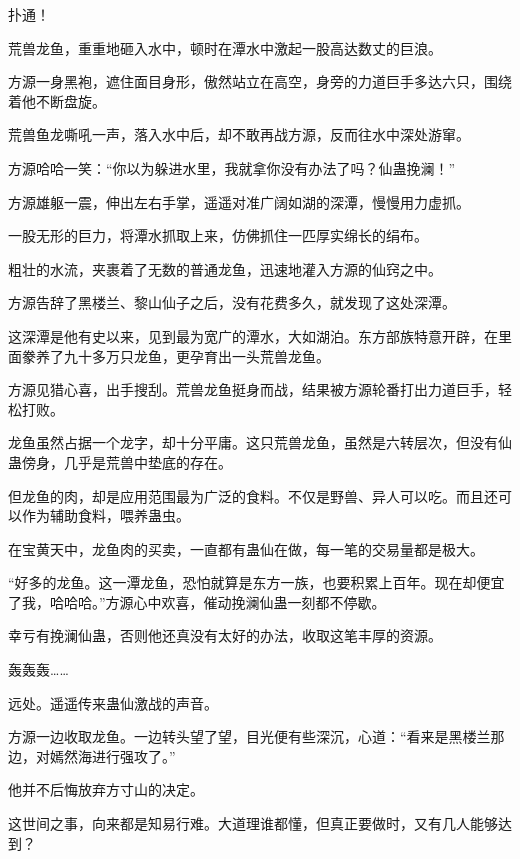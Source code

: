 
\begin{this_body}



扑通！

荒兽龙鱼，重重地砸入水中，顿时在潭水中激起一股高达数丈的巨浪。

方源一身黑袍，遮住面目身形，傲然站立在高空，身旁的力道巨手多达六只，围绕着他不断盘旋。

荒兽鱼龙嘶吼一声，落入水中后，却不敢再战方源，反而往水中深处游窜。

方源哈哈一笑：“你以为躲进水里，我就拿你没有办法了吗？仙蛊挽澜！”

方源雄躯一震，伸出左右手掌，遥遥对准广阔如湖的深潭，慢慢用力虚抓。

一股无形的巨力，将潭水抓取上来，仿佛抓住一匹厚实绵长的绢布。

粗壮的水流，夹裹着了无数的普通龙鱼，迅速地灌入方源的仙窍之中。

方源告辞了黑楼兰、黎山仙子之后，没有花费多久，就发现了这处深潭。

这深潭是他有史以来，见到最为宽广的潭水，大如湖泊。东方部族特意开辟，在里面豢养了九十多万只龙鱼，更孕育出一头荒兽龙鱼。

方源见猎心喜，出手搜刮。荒兽龙鱼挺身而战，结果被方源轮番打出力道巨手，轻松打败。

龙鱼虽然占据一个龙字，却十分平庸。这只荒兽龙鱼，虽然是六转层次，但没有仙蛊傍身，几乎是荒兽中垫底的存在。

但龙鱼的肉，却是应用范围最为广泛的食料。不仅是野兽、异人可以吃。而且还可以作为辅助食料，喂养蛊虫。

在宝黄天中，龙鱼肉的买卖，一直都有蛊仙在做，每一笔的交易量都是极大。

“好多的龙鱼。这一潭龙鱼，恐怕就算是东方一族，也要积累上百年。现在却便宜了我，哈哈哈。”方源心中欢喜，催动挽澜仙蛊一刻都不停歇。

幸亏有挽澜仙蛊，否则他还真没有太好的办法，收取这笔丰厚的资源。

轰轰轰……

远处。遥遥传来蛊仙激战的声音。

方源一边收取龙鱼。一边转头望了望，目光便有些深沉，心道：“看来是黑楼兰那边，对嫣然海进行强攻了。”

他并不后悔放弃方寸山的决定。

这世间之事，向来都是知易行难。大道理谁都懂，但真正要做时，又有几人能够达到？


\end{this_body}
